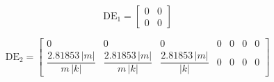 \documentclass[]{report}
\begin{document}
\begin{equation}
	\mathrm{DE}_1 =
	\begin{bmatrix}
		0 & 0 \\
		0 & 0
	\end{bmatrix}
\end{equation}

\begin{equation}
	\mathrm{DE}_2 =
	\begin{bmatrix}
		0 & 0 & 0 & 0 & 0 & 0 & 0 \\
		\dfrac{2.81853\,|m|}{m\,|k|} & \dfrac{2.81853\,|m|}{m\,|k|} & \dfrac{2.81853\,|m|}{|k|} & 0 & 0 & 0 & 0
	\end{bmatrix}
\end{equation}


	
\end{document}
